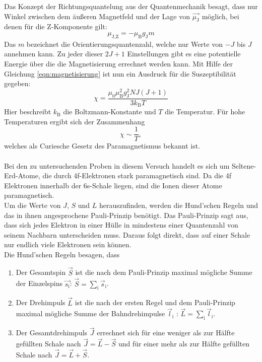 Das Konzept der Richtungsquantelung aus der Quantenmechanik besagt, dass nur Winkel zwischen dem äußeren Magnetfeld und der Lage von $\vec{\mu_{\text{J}}}$ möglich, bei denen für die Z-Komponente gilt:
\begin{equation*}
    \mu_{\text{J},\text{Z}} = - \mu_{\text{B}} g_{\text{J}} m 
\end{equation*}
Das $m$ bezeichnet die Orientierungsquantenzahl, welche nur Werte von $-J$ bis $J$ annehmen kann. 
Zu jeder dieser $2J+1$ Einstellungen gibt es eine potentielle Energie über die die Magnetisierung errechnet werden kann. 
Mit Hilfe der Gleichung \eqref{eqn:magnetisierung} ist nun ein Ausdruck für die Suszeptibilität gegeben:
\begin{equation} \label{eqn:sus_theo}
    \chi = \frac{\mu_0 \mu_{\text{B}}^2 g_{\text{J}}^2 N J (J+1)}{3 k_{\text{B}} T}
\end{equation}
Hier beschreibt $k_{\text{B}}$ die Boltzmann-Konstante und $T$ die Temperatur.
Für hohe Temperaturen ergibt sich der Zusammenhang 
\begin{equation*}
    \chi \sim \frac{1}{T},
\end{equation*}
welches als Curiesche Gesetz des Paramagnetismus bekannt ist.\\
\\
Bei den zu untersuchenden Proben in diesem Versuch handelt es sich um Seltene-Erd-Atome, die durch 4f-Elektronen stark paramagnetisch sind.
Da die 4f Elektronen innerhalb der 6s-Schale liegen, sind die Ionen dieser Atome paramagnetisch.\\
Um die Werte von $J$, $S$ und $L$ herauszufinden, werden die Hund'schen Regeln und das in ihnen angesprochene Pauli-Prinzip benötigt.
Das Pauli-Prinzip sagt aus, dass sich jedes Elektron in einer Hülle in mindestens einer Quantenzahl von seinem Nachbarn unterscheiden muss.
Daraus folgt direkt, dass auf einer Schale nur endlich viele Elektronen sein können.\\
Die Hund'schen Regeln besagen, dass
\begin{enumerate}
    \item Der Gesamtspin $\vec{S}$ ist die nach dem Pauli-Prinzip maximal mögliche Summe der Einzelspins $\vec{s_{\text{i}}}$: $\vec{S} = \sum_{\text{i}} \vec{s}_{\text{i}}$.
    \item Der Drehimpuls $\vec{L}$ ist die nach der ersten Regel und dem Pauli-Prinzip maximal mögliche Summe der Bahndrehimpulse $\vec{l}_{\text{i}}$ : $\vec{L} = \sum_{\text{i}} \vec{l}_{\text{i}}$.
    \item Der Gesamtdrehimpuls $\vec{J}$ errechnet sich für eine weniger als zur Hälfte gefüllten Schale nach $\vec{J} = \vec{L} - \vec{S}$ und für einer mehr als zur Hälfte gefüllten Schale nach $\vec{J} = \vec{L} + \vec{S}$.
\end{enumerate}

